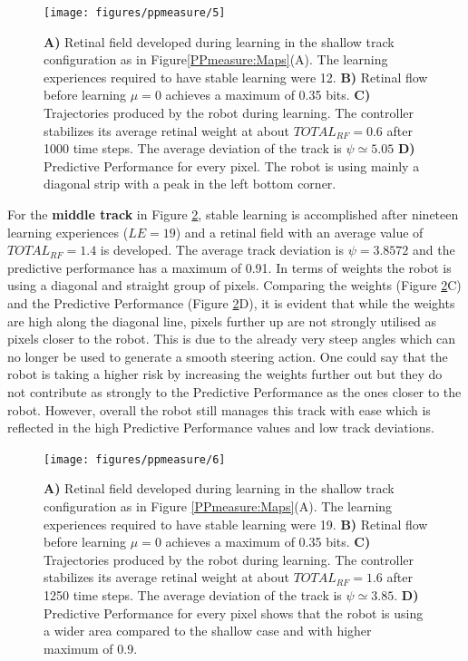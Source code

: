 \begin{figure}[!hbt]
	\begin{center}
	\texttt{[image: figures/ppmeasure/5]}
	\end{center}
	\caption[Performance for the shallow track]{
	{\bf A)} Retinal field developed during learning in the shallow track configuration as in Figure\ref{PPmeasure:Maps}(A).
		      The learning experiences required to have stable learning were 12.
	{\bf B)} Retinal flow before learning $\mu=0$ achieves a maximum of 0.35 bits. 
	{\bf C)} Trajectories produced by the robot during learning. The controller stabilizes its average retinal weight at about $TOTAL_{RF}=0.6$ after 1000 time steps. The average deviation of the track is $\psi \simeq 5.05$  
	{\bf D)} Predictive Performance for every pixel. The robot is using mainly a diagonal strip with a peak in the left bottom corner. \label{PPmeasure:shallow}}
\end{figure}

For the \textbf{middle track} in Figure \ref{PPmeasure:middle}, stable learning is accomplished
after nineteen learning experiences ($LE=19$) and a retinal field
with an average value of $TOTAL_{RF}=1.4$ is developed.
The average track deviation is $\psi=3.8572$ and the predictive performance has a
maximum of 0.91.
In terms of weights the robot is using a diagonal and straight group of pixels.
Comparing the weights (Figure \ref{PPmeasure:middle}C) and the
Predictive Performance (Figure \ref{PPmeasure:middle}D),
it is evident that while the weights are high along the diagonal line, pixels further up
are not strongly utilised as pixels closer to the robot.
This is due to the already very steep angles which can no
longer be used to generate a smooth steering action. One could say that the
robot is taking a higher risk by increasing the weights further out but they do
not contribute as strongly to the Predictive Performance as the ones closer to
the robot. However, overall the robot still manages this track with ease which is
reﬂected in the high Predictive Performance values and low track deviations.

\begin{figure}[!hbt]
	\begin{center}
		\texttt{[image: figures/ppmeasure/6]}
	\end{center}
	\caption[Performance for the intermediate track]{
	{\bf A)} Retinal field developed during learning in the shallow track configuration as in Figure \ref{PPmeasure:Maps}(A).
		      The learning experiences required to have stable learning were 19.
	{\bf B)} Retinal flow before learning $\mu=0$ achieves a maximum of 0.35 bits. 
	{\bf C)} Trajectories produced by the robot during learning. The controller stabilizes its average retinal weight at about $TOTAL_{RF}=1.6$ after 1250 time steps. The average deviation of the track is $\psi \simeq 3.85$.  
	{\bf D)} Predictive Performance for every pixel shows that the robot is using a wider area compared to the shallow case and with higher maximum of 0.9. \label{PPmeasure:middle}}
\end{figure}

